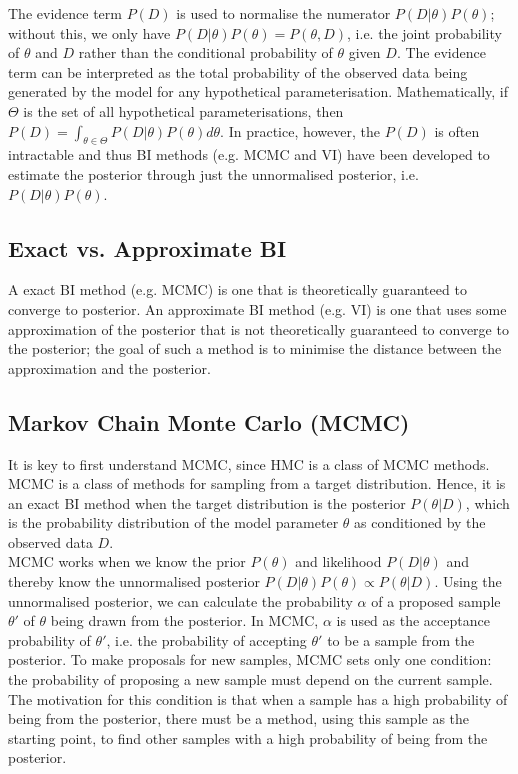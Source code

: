 \documentclass[conference]{IEEEtran}
\begin{document}
The evidence term $P(D)$ is used to normalise the numerator $P(D|\theta)P(\theta)$; without this, we only have $P(D|\theta)P(\theta) = P(\theta, D)$, i.e. the joint probability of $\theta$ and $D$ rather than the conditional probability of $\theta$ given $D$. The evidence term can be interpreted as the total probability of the observed data being generated by the model for any hypothetical parameterisation. Mathematically, if $\Theta$ is the set of all hypothetical parameterisations, then $P(D) = \int_{\theta \in \Theta} P(D|\theta)P(\theta) d\theta$. In practice, however, the $P(D)$ is often intractable and thus BI methods (e.g. MCMC and VI) have been developed to estimate the posterior through just the unnormalised posterior, i.e. $P(D|\theta)P(\theta)$.

\subsection{Exact vs. Approximate BI}
A exact BI method (e.g. MCMC) is one that is theoretically guaranteed to converge to posterior. An approximate BI method (e.g. VI) is one that uses some approximation of the posterior that is not theoretically guaranteed to converge to the posterior; the goal of such a method is to minimise the distance between the approximation and the posterior.

\subsection{Markov Chain Monte Carlo (MCMC)}
It is key to first understand MCMC, since HMC is a class of MCMC methods. MCMC is a class of methods for sampling from a target distribution. Hence, it is an exact BI method when the target distribution is the posterior $P(\theta|D)$, which is the probability distribution of the model parameter $\theta$ as conditioned by the observed data $D$.\\

MCMC works when we know the prior $P(\theta)$ and likelihood $P(D|\theta)$ and thereby know the unnormalised posterior $P(D|\theta)P(\theta) \propto P(\theta|D)$. Using the unnormalised posterior, we can calculate the probability $\alpha$ of a proposed sample $\theta'$ of $\theta$ being drawn from the posterior. In MCMC, $\alpha$ is used as the acceptance probability of $\theta'$, i.e. the probability of accepting $\theta'$ to be a sample from the posterior. To make proposals for new samples, MCMC sets only one condition: the probability of proposing a new sample must depend on the current sample. The motivation for this condition is that when a sample has a high probability of being from the posterior, there must be a method, using this sample as the starting point, to find other samples with a high probability of being from the posterior.\\
\end{document}
